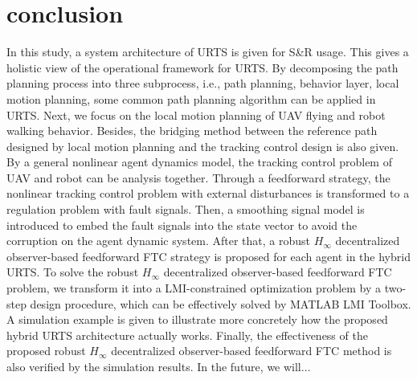 \documentclass{ieeeaccess}
\begin{document}
\section{conclusion}
In this study, a system architecture of URTS is given for S\&R usage. This gives a holistic view of the operational framework for URTS. By decomposing the path planning process into three subprocess, i.e., path planning, behavior layer, local motion planning, some common path planning algorithm can be applied in URTS. Next, we focus on the local motion planning of UAV flying and robot walking behavior. Besides, the bridging method between the reference path designed by local motion planning and the tracking control design is also given. By a general nonlinear agent dynamics model, the tracking control problem of UAV and robot can be analysis together. Through a feedforward strategy, the nonlinear tracking control problem with external disturbances is transformed to a regulation problem with fault signals. Then, a smoothing signal model is introduced to embed the fault signals into the state vector to avoid the corruption on the agent dynamic system. After that, a robust $H_\infty$ decentralized observer-based feedforward FTC strategy is proposed for each agent in the hybrid URTS. To solve the robust $H_\infty$ decentralized observer-based feedforward FTC problem, we transform it into a LMI-constrained optimization problem by a two-step design procedure, which can be effectively solved by MATLAB LMI Toolbox. A simulation example is given to illustrate more concretely how the proposed hybrid URTS architecture actually works. Finally, the effectiveness of the proposed robust $H_\infty$ decentralized observer-based feedforward FTC method is also verified by the simulation results. In the future, we will...




\EOD
\end{document}
